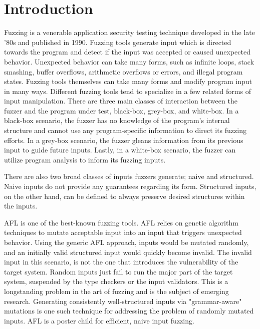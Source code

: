 \documentclass[12pt]{diazessay}
\begin{document}
\section*{Introduction}
Fuzzing is a venerable application security testing technique developed in the late '80s\cite{Barton1988} and published in 1990\cite{Miller1990}.
Fuzzing tools generate input which is directed towards the program and detect if the input was accepted or caused unexpected behavior.
Unexpected behavior can take many forms, such as infinite loops, stack smashing, buffer overflows, arithmetic overflows or errors, and illegal program states.
Fuzzing tools themselves can take many forms\cite{ModelBasedFuzzing}\cite{GrammarBasedFuzzing}\cite{ProtocolBasedFuzzing} and modify program input in many ways.
Different fuzzing tools tend to specialize in a few related forms of input\cite{InputDiversity} manipulation.
There are three main classes of interaction between the fuzzer and the program under test, black-box\cite{takanen2018fuzzing}, grey-box, and white-box\cite{fuzzingsurvey}.
In a black-box scenario, the fuzzer has no knowledge of the program's internal structure and cannot use any program-specific information to direct its fuzzing efforts.
In a grey-box scenario, the fuzzer gleans information from its previous input to guide future inputs.
Lastly, in a white-box scenario, the fuzzer can utilize program analysis to inform its fuzzing inputs.

There are also two broad classes of inputs fuzzers generate; naive and structured\cite{fuzzingsurvey}.
Naive inputs do not provide any guarantees regarding its form.
Structured inputs, on the other hand, can be defined to always preserve desired structures within the inputs.

AFL\cite{AFL_page} is one of the best-known fuzzing tools. AFL relies on genetic algorithm techniques\cite{InputMutationAlgorithm} to mutate acceptable input into an input that triggers unexpected behavior.
Using the generic AFL approach, inputs would be mutated randomly, and an initially valid structured input would quickly become invalid.
The invalid input in this scenario, is not the one that introduces the vulnerability of the target system.
Random inputs just fail to run the major part of the target system, suspended by the type checkers or the input validators.
This is a longstanding problem in the art of fuzzing and is the subject of emerging research.
Generating consistently well-structured inputs\cite{structuredInput} via "grammar-aware" mutations is one such technique for addressing the problem of randomly mutated inputs.
AFL is a poster child for efficient, naive input fuzzing.
\end{document}
